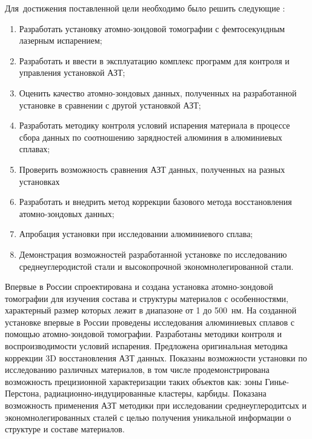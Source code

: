 Для~достижения поставленной цели необходимо было решить следующие {\tasks}:
\begin{enumerate}[beginpenalty=10000]
  \item Разработать установку атомно-зондовой томографии с фемтосекундным лазерным испарением;
  \item Разработать и ввести в эксплуатацию комплекс программ для контроля и управления установкой АЗТ;
  \item Оценить качество атомно-зондовых данных, полученных на разработанной установке в сравнении с другой установкой АЗТ;
  \item Разработать методику контроля условий испарения материала в процессе сбора данных по соотношению зарядностей алюминия в алюминиевых сплавах;
  \item Проверить возможность сравнения АЗТ данных, полученных на разных установках
  \item Разработать и внедрить метод коррекции базового метода восстановления атомно-зондовых данных;
  \item Апробация установки при исследовании алюминиевого сплава;
  \item Демонстрация возможностей разработанной установке по исследованию среднеуглеродистой стали и высокопрочной экономнолегированной стали.
\end{enumerate}


{\novelty}
Впервые в России спроектирована и создана установка атомно-зондовой томографии для изучения состава и структуры материалов с особенностями, характерный размер которых лежит в диапазоне от 1 до 500~нм. На созданной установке впервые в России проведены исследования алюминиевых сплавов с помощью атомно-зондовой томографии. Разработаны методики контроля и воспроизводимости условий испарения. Предложена оригинальная методика коррекции 3D восстановления АЗТ данных. Показаны возможности установки по исследованию различных материалов, в том числе продемонстрирована возможность прецизионной характеризации таких объектов как: зоны Гинье-Перстона, радиационно-индуцированные кластеры, карбиды. Показана возможность применения АЗТ методики при исследовании среднеуглеродитсых и экономнолегированных сталей с целью получения уникальной информации о структуре и составе материалов.

